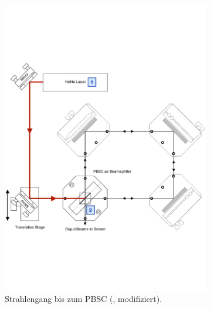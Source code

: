 \begin{figure}[!ht]
\begin{subfigure}[c]{0.50\textwidth}
    \includegraphics[width=\textwidth]{content/images/interferometer_1.pdf}
    \caption{Strahlengang bis zum PBSC (\cite{teachspin}, modifiziert).\\
	 \vspace{2.12cm}}
	\label{fig:int_pbsc}
\end{subfigure}
\hspace*{\fill}
\begin{subfigure}[c]{0.50\textwidth}

\end{subfigure}
\end{figure}
